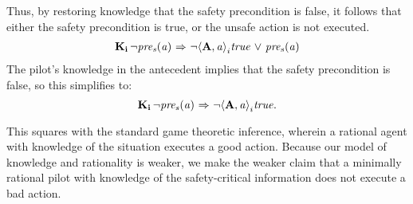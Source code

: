 Thus, by restoring knowledge that the safety precondition is false, it follows that either the safety precondition is true, or the unsafe action is not executed. 
\begin{eqnarray}
\mathbf{K}_{\mathbf{i}}\,{\neg} \mathit{pre_s}(\mathit{a}) {\ \Rightarrow \ } {\neg} \mathbf{\langle A,\mathit{a}\rangle}_i\mathit{true} {\ \vee \ } \mathit{pre_s}(\mathit{a})
\end{eqnarray}
The pilot's knowledge in the antecedent implies that the safety precondition is false, so this simplifies to:
\begin{equation}
\mathbf{K}_{\mathbf{i}}\,{\neg} \mathit{pre_s}(\mathit{a}) {\ \Rightarrow \ } {\neg} \mathbf{\langle A, \mathit{a}\rangle}_i\mathit{true}.
\end{equation}

This squares with the standard game theoretic inference, wherein a rational agent with knowledge of the situation executes a good action. Because our model of knowledge and rationality is weaker, we make the weaker claim that a minimally rational pilot with knowledge of the safety-critical information does not execute a bad action.


